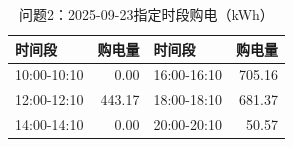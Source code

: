 \begin{table}[H]\centering\small\caption{问题2：2025-09-23指定时段购电（kWh）}\label{tab:q220250923p}
\begin{tabular}{lrlr}\toprule
时间段 & 购电量 & 时间段 & 购电量\\\midrule
10:00-10:10 & 0.00 & 16:00-16:10 & 705.16\\
12:00-12:10 & 443.17 & 18:00-18:10 & 681.37\\
14:00-14:10 & 0.00 & 20:00-20:10 & 50.57\\
\bottomrule\end{tabular}\end{table}
